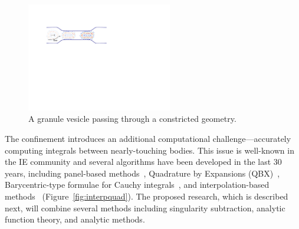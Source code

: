 \begin{figure}
  \centering
  \includegraphics[width=2.5in]{figures/SA2Figures/confinement.pdf}
  \vspace{-10pt}
  \caption{\label{fig:stenosis} \footnotesize A granule vesicle passing
  through a constricted geometry.}
\end{figure}
The confinement introduces an additional computational
challenge---accurately computing integrals between nearly-touching
bodies. This issue is well-known in the IE community and several
algorithms have been developed in the last 30 years, including
panel-based methods~\cite{helsing_2008a, helsing_tutorial_2012},
Quadrature by Expansions (QBX)~\cite{din-hua-mar-tan2021,
klo-bar-gre-one2013, ste-bar2022, af2018sisc}, Barycentric-type formulae
for Cauchy integrals~\cite{bar2014, bar-wu-vee2015, ioa-pap-per1991},
and interpolation-based methods~\cite{ying_2006, qua-bir2014,
rah-vee-zor-bir2015} (Figure~\ref{fig:interpquad}). The proposed
research, which is described next, will combine several methods
including singularity subtraction, analytic function theory, and
analytic methods.

